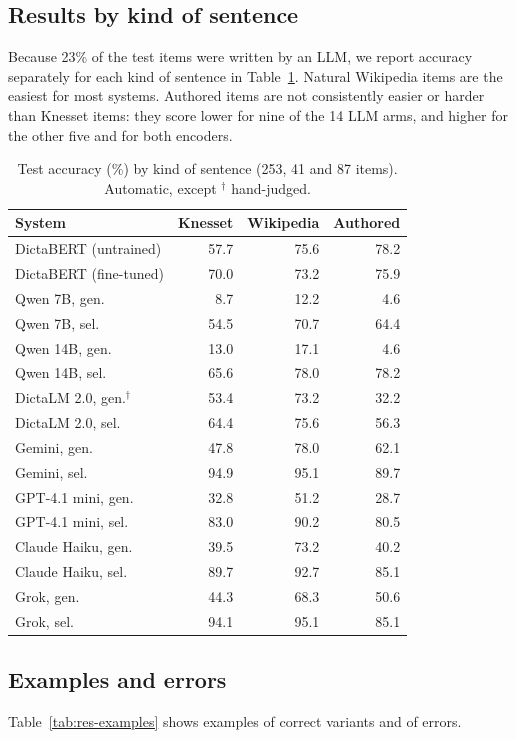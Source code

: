 \documentclass[11pt]{article}
\newcommand{\heb}[1]{\R{#1}}
\begin{document}
\subsection{Results by kind of sentence}
\label{sec:res-source}
Because 23\% of the test items were written by an LLM, we report accuracy separately for each kind of sentence in Table~\ref{tab:res-source}. Natural Wikipedia items are the easiest for most systems. Authored items are not consistently easier or harder than Knesset items: they score lower for nine of the 14 LLM arms, and higher for the other five and for both encoders.

\begin{table}[t]
\centering\small
\begin{tabular}{lrrr}
\toprule
System & Knesset & Wikipedia & Authored \\
\midrule
DictaBERT (untrained) & 57.7 & 75.6 & 78.2 \\
DictaBERT (fine-tuned) & 70.0 & 73.2 & 75.9 \\
\midrule
Qwen 7B, gen. & 8.7 & 12.2 & 4.6 \\
Qwen 7B, sel. & 54.5 & 70.7 & 64.4 \\
Qwen 14B, gen. & 13.0 & 17.1 & 4.6 \\
Qwen 14B, sel. & 65.6 & 78.0 & 78.2 \\
DictaLM 2.0, gen.$^{\dagger}$ & 53.4 & 73.2 & 32.2 \\
DictaLM 2.0, sel. & 64.4 & 75.6 & 56.3 \\
\midrule
Gemini, gen. & 47.8 & 78.0 & 62.1 \\
Gemini, sel. & 94.9 & 95.1 & 89.7 \\
GPT-4.1 mini, gen. & 32.8 & 51.2 & 28.7 \\
GPT-4.1 mini, sel. & 83.0 & 90.2 & 80.5 \\
Claude Haiku, gen. & 39.5 & 73.2 & 40.2 \\
Claude Haiku, sel. & 89.7 & 92.7 & 85.1 \\
Grok, gen. & 44.3 & 68.3 & 50.6 \\
Grok, sel. & 94.1 & 95.1 & 85.1 \\
\bottomrule
\end{tabular}
\caption{Test accuracy (\%) by kind of sentence (253, 41 and 87 items). Automatic, except $^{\dagger}$ hand-judged.}
\label{tab:res-source}
\end{table}

\subsection{Examples and errors}
\label{sec:res-errors}
Table~\ref{tab:res-examples} shows examples of correct variants and of errors.
\end{document}
